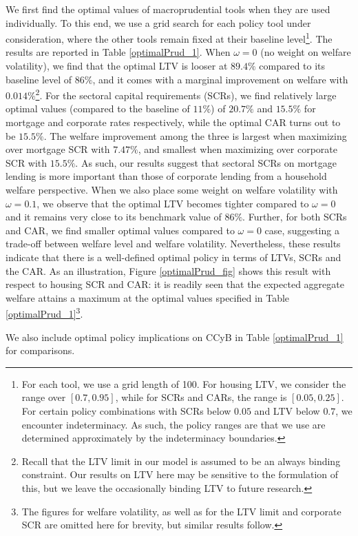\documentclass[12pt]{article}
\numberwithin{equation}{section}
\begin{document}
We first find the optimal values of macroprudential tools when they are used individually. To this end, we use a grid search for each policy tool under consideration, where the other tools remain fixed at their baseline level\footnote{For each tool, we use a grid length of 100. For housing LTV, we consider the range over $[0.7,0.95]$, while for SCRs and CARs, the range is $[0.05,0.25]$. For certain policy combinations with SCRs below $0.05$ and LTV below $0.7$, we encounter indeterminacy. As such, the policy ranges are that we use are determined approximately by the indeterminacy boundaries.}. The results are reported in Table \ref{optimalPrud_1}. When $\omega=0$ (no weight on welfare volatility), we find that the optimal LTV is looser at $89.4 \%$ compared to its baseline level of $86 \%$, and it comes with a marginal improvement on welfare with $0.014 \%$\footnote{Recall that the LTV limit in our model is assumed to be an always binding constraint. Our results on LTV here may be sensitive to the formulation of this, but we leave the occasionally binding LTV to future research.}. For the sectoral capital requirements (SCRs), we find relatively large optimal values (compared to the baseline of $11 \%$) of $20.7 \% $ and $15.5 \%$ for mortgage and corporate rates respectively, while the optimal CAR turns out to be $15.5 \%$. The welfare improvement among the three is largest when maximizing over mortgage SCR with $7.47 \%$, and smallest when maximizing over corporate SCR with  $15.5 \%$. As such, our results suggest that sectoral SCRs on mortgage lending is more important than those of corporate lending from a household welfare perspective. When we also place some weight on welfare volatility with $\omega=0.1$, we observe that the optimal LTV becomes tighter compared to $\omega=0$ and it remains very close to its benchmark value of $86 \%$. Further, for both SCRs and CAR, we find smaller optimal values compared to $\omega=0$ case, suggesting a trade-off between welfare level and welfare volatility. Nevertheless, these results indicate that there is a well-defined optimal policy in terms of LTVs, SCRs and the CAR. As an illustration, Figure \ref{optimalPrud_fig} shows this result with respect to housing SCR and CAR: it is readily seen that the expected aggregate welfare  attains a maximum at the optimal values specified in Table \ref{optimalPrud_1}\footnote{The figures for welfare volatility, as well as for the LTV limit and corporate SCR are omitted here for brevity, but similar results follow.}.

We also include optimal policy implications on CCyB in Table \ref{optimalPrud_1} for comparisons. 
\end{document}
